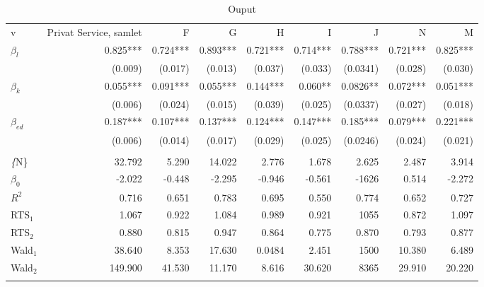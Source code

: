 \begin{table}[tb]
	\centering
	\caption{Ouput}
	\label{tab:ouput3}
	\begin{tabular}{@{}lrrrrrrrr@{}}
		\arrayrulecolor{MidnightBlue}\toprule
		v            & Privat Service, samlet & F        & G        & H        & I        & J        & N        & M        \\ \arrayrulecolor{MidnightBlue}\midrule
		$\beta_l$    & 0.825***               & 0.724*** & 0.893*** & 0.721*** & 0.714*** & 0.788*** & 0.721*** & 0.825*** \\
		& (0.009)                & (0.017)  & (0.013)  & (0.037)  & (0.033)  & (0.0341) & (0.028)  & (0.030)  \\
		$\beta_k$    & 0.055***               & 0.091*** & 0.055*** & 0.144*** & 0.060**  & 0.0826** & 0.072*** & 0.051*** \\
		& (0.006)                & (0.024)  & (0.015)  & (0.039)  & (0.025)  & (0.0337) & (0.027)  & (0.018)  \\
		$\beta_{ed}$ & 0.187***               & 0.107*** & 0.137*** & 0.124*** & 0.147*** & 0.185*** & 0.079*** & 0.221*** \\
		& (0.006)                & (0.014)  & (0.017)  & (0.029)  & (0.025)  & (0.0246) & (0.024)  & (0.021)  \\
		&                        &          &          &          &          &          &          &          \\
		\emph\{N\}   & 32.792                 & 5.290    & 14.022   & 2.776    & 1.678    & 2.625    & 2.487    & 3.914    \\
		$\beta_0$    & -2.022                 & -0.448   & -2.295   & -0.946   & -0.561   & -1626    & 0.514    & -2.272   \\
		$R^2$        & 0.716                  & 0.651    & 0.783    & 0.695    & 0.550    & 0.774    & 0.652    & 0.727    \\
		RTS$_1$      & 1.067                  & 0.922    & 1.084    & 0.989    & 0.921    & 1055     & 0.872    & 1.097    \\
		RTS$_2$      & 0.880                  & 0.815    & 0.947    & 0.864    & 0.775    & 0.870    & 0.793    & 0.877    \\
		Wald$_1$     & 38.640                 & 8.353    & 17.630   & 0.0484   & 2.451    & 1500     & 10.380   & 6.489    \\
		Wald$_2$     & 149.900                & 41.530   & 11.170   & 8.616    & 30.620   & 8365     & 29.910   & 20.220  \\\arrayrulecolor{MidnightBlue}\bottomrule
	\end{tabular}
\end{table}
